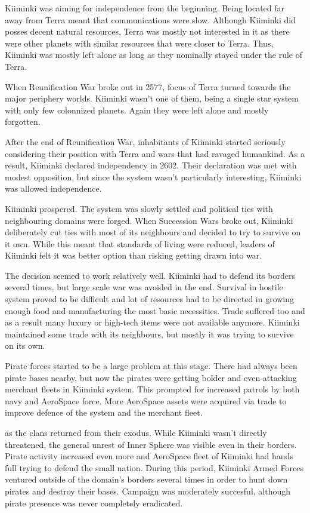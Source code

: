 \documentclass{tufte-book}
\begin{document}
Kiiminki was aiming for independence from the beginning. Being located far
away from Terra meant that communications were slow. Although Kiiminki did
posses decent natural resources, Terra was mostly not interested in it as
there were other planets with similar resources that were closer to Terra.
Thus, Kiiminki was mostly left alone as long as they nominally stayed under
the rule of Terra.

When Reunification War broke out in 2577, focus of Terra turned towards the
major periphery worlds. Kiiminki wasn't one of them, being a single star
system with only few colonnized planets. Again they were left alone and
mostly forgotten.

After the end of Reunification War, inhabitants of Kiiminki started seriously
considering their position with Terra and wars that had ravaged humankind. As
a result, Kiiminki declared independency in 2602. Their declaration was met
with modest opposition, but since the system wasn't particularly interesting,
Kiiminki was allowed independence.

 Kiiminki prospered. The system was slowly
settled and political ties with neighbouring domains were forged. When
Succession Wars broke out, Kiiminki deliberately cut ties with most of its
neighbours and decided to try to survive on it own. While this meant that
standards of living were reduced, leaders of Kiiminki felt it was better
option than risking getting drawn into war.

The decision seemed to work relatively well. Kiiminki had to defend its
borders several times, but large scale war was avoided in the end. Survival
in hostile system proved to be difficult and lot of resources had to be
directed in growing enough food and manufacturing the most basic necessities.
Trade suffered too and as a result many luxury or high-tech items were not
available anymore. Kiiminki maintained some trade with its neighbours, but
mostly it was trying to survive on its own.

Pirate forces started to be a large problem at this stage. There had always
been pirate bases nearby, but now the pirates were getting bolder and
even attacking merchant fleets in Kiiminki system. This prompted for
increased patrols by both navy and AeroSpace force. More AeroSpace assets were
acquired via trade to improve defence of the system and the merchant fleet.

 as the clans returned from their
exodus. While Kiiminki wasn't directly threatened, the general unrest of
Inner Sphere was visible even in their borders. Pirate activity increased even
more and AeroSpace fleet of Kiiminki had hands full trying to defend the
small nation. During this period, Kiiminki Armed Forces ventured outside of
the domain's borders several times in order to hunt down pirates and destroy
their bases. Campaign was moderately succesful, although pirate presence was
never completely eradicated.
\end{document}
